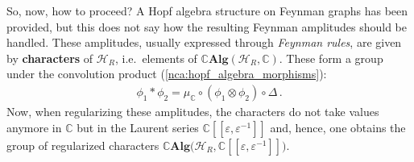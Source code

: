     So, now, how to proceed? A Hopf algebra structure on Feynman graphs has been provided, but this does not say how the resulting Feynman amplitudes should be handled. These amplitudes, usually expressed through \textit{Feynman rules}, are given by \textbf{characters} of $\mathcal{H}_R$, i.e.~elements of $\mathbb{C}\mathbf{Alg}(\mathcal{H}_R,\mathbb{C})$. These form a group under the convolution product (\cref{nca:hopf_algebra_morphisms}):
    \begin{gather}
        \phi_1\ast\phi_2 = \mu_{\mathbb{C}}\circ(\phi_1\otimes\phi_2)\circ\Delta\,.
    \end{gather}
    Now, when regularizing these amplitudes, the characters do not take values anymore in $\mathbb{C}$ but in the Laurent series $\mathbb{C}[[\varepsilon,\varepsilon^{-1}]]$ and, hence, one obtains the group of regularized characters $\mathbb{C}\mathbf{Alg}\bigl(\mathcal{H}_R,\mathbb{C}[[\varepsilon,\varepsilon^{-1}]]\bigr)$.

